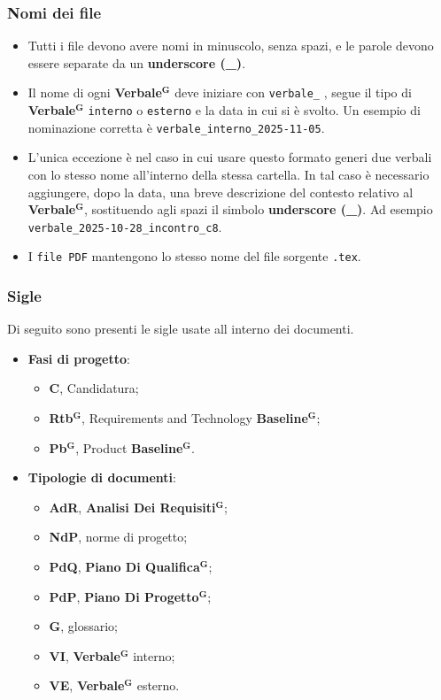 \documentclass[a4paper,12pt]{article}
\newcommand{\term}[1]{\textbf{#1}$^\mathbf{G}$}
\begin{document}
\subsubsection*{Nomi dei file}
\begin{itemize}
    \item Tutti i file devono avere nomi in minuscolo, senza spazi, e le parole devono essere separate da un \textbf{underscore (\_)}.
    \item Il nome di ogni \term{Verbale} deve iniziare con \texttt{verbale\_} , segue il tipo di \term{Verbale} \texttt{interno} o \texttt{esterno} e la data in cui si è svolto. Un esempio di nominazione corretta è \texttt{verbale\_interno\_2025-11-05}.
    \item L'unica eccezione è nel caso in cui usare questo formato generi due verbali con lo stesso nome all'interno della stessa cartella. In tal caso è necessario aggiungere, dopo la data, una breve descrizione del contesto relativo al \term{Verbale}, sostituendo agli spazi il simbolo \textbf{underscore (\_)}. Ad esempio \texttt{verbale\_2025-10-28\_incontro\_c8}.
    \item I \texttt{file PDF} mantengono lo stesso nome del file sorgente \texttt{.tex}.
\end{itemize}

\subsubsection*{Sigle} \label{sigle}
Di seguito sono presenti le sigle usate all interno dei documenti.
\begin{itemize}
    \item \textbf{Fasi di progetto}:
    \begin{itemize}
        \item \textbf{C}, Candidatura;
        \item \textbf{\term{Rtb}}, Requirements and Technology \term{Baseline};
        \item \textbf{\term{Pb}}, Product \term{Baseline}.
    \end{itemize}
    \item \textbf{Tipologie di documenti}:
    \begin{itemize}
        \item \textbf{AdR}, \term{Analisi Dei Requisiti};
        \item \textbf{NdP}, norme di progetto;
        \item \textbf{PdQ}, \term{Piano Di Qualifica};
        \item \textbf{PdP}, \term{Piano Di Progetto};
        \item \textbf{G}, glossario;
        \item \textbf{VI}, \term{Verbale} interno;
        \item \textbf{VE}, \term{Verbale} esterno.
    \end{itemize}
\end{itemize}
\end{document}
